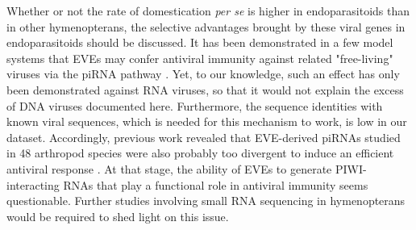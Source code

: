 Whether or not the rate of domestication \textit{per se} is higher in endoparasitoids than in other hymenopterans, the selective advantages brought by these viral genes in endoparasitoids should be discussed. It has been demonstrated in a few model systems that EVEs may confer antiviral immunity against related "free-living" viruses via the piRNA pathway  \citep{suzuki_non-retroviral_2020,whitfield_diversity_2017}. Yet, to our knowledge, such an effect has only been demonstrated against RNA viruses, so that it would not explain the excess of DNA viruses documented here. Furthermore, the sequence identities with known viral sequences, which is needed for this mechanism to work, is low in our dataset. Accordingly, previous work revealed that EVE-derived piRNAs studied in 48 arthropod species were also probably too divergent to induce an efficient antiviral response \citep{ter_horst_endogenous_2019}. At that stage, the ability of EVEs to generate PIWI-interacting RNAs that play a functional role in antiviral immunity seems questionable. Further studies involving small RNA sequencing in hymenopterans would be required to shed light on this issue.
